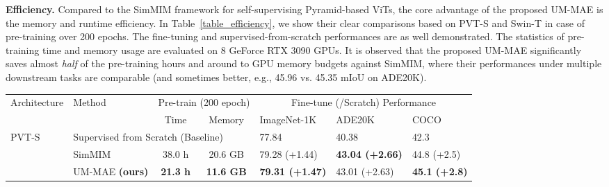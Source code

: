 \documentclass{article}
\begin{document}
\textbf{Efficiency.} Compared to the SimMIM framework for self-supervising Pyramid-based ViTs, the core advantage of the proposed UM-MAE is the memory and runtime efficiency. In Table~\ref{table_efficiency}, we show their clear comparisons based on PVT-S and Swin-T in case of pre-training over 200 epochs. The fine-tuning and supervised-from-scratch performances are as well demonstrated. The statistics of pre-training time and memory usage are evaluated on 8 GeForce RTX 3090 GPUs. It is observed that the proposed UM-MAE significantly saves almost \emph{half} of the pre-training hours and around {  to  GPU memory budgets} against SimMIM, where their performances under multiple downstream tasks are comparable (and sometimes better, e.g., 45.96 vs. 45.35 mIoU on ADE20K). 


\begin{table}
	\vspace{0pt}
    \renewcommand\arraystretch{1.2}
\footnotesize
    \centering
    \resizebox{0.92\textwidth}{!}
    {
        \begin{tabular}{l|l||c|c||l|l|l}
        \hline
        \multirow{2}{*}{Architecture}& \multirow{2}{*}{Method} & \multicolumn{2}{c||}{Pre-train { (200 epoch)} } & \multicolumn{3}{c}{Fine-tune (/Scratch) Performance}
        \\\cline{3-7}
         & &  Time & Memory & ImageNet-1K &  ADE20K & COCO \\
        \hline
        \multirow{3}{*}{PVT-S~\cite{wang2021pyramid}} & \multicolumn{3}{l||}{Supervised from Scratch (Baseline)}  & 77.84 & 40.38 & 42.3 \\ \cline{2-7}
        & SimMIM~\cite{xie2021simmim} &  38.0 h & 20.6 GB & 79.28 {\scriptsize (+1.44)} & \textbf{43.04 {\scriptsize (+2.66)}} & 44.8 {\scriptsize (+2.5)}  \\
        & UM-MAE \textbf{(ours)} & \textbf{21.3 h}  & \textbf{11.6 GB} & \textbf{79.31 {\scriptsize (+1.47)}} & 43.01 {\scriptsize (+2.63)} & \textbf{45.1 {\scriptsize (+2.8)}} \\ \hline
        

\end{tabular}}
\end{table}
\end{document}
